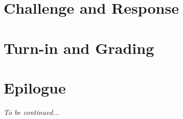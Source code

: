     \section{Challenge and Response} \label{sec:challengeResponse}  

    \section{Turn-in and Grading}                                   

    \section*{Epilogue} \InsurancePreview

    \textit{To be continued...}


